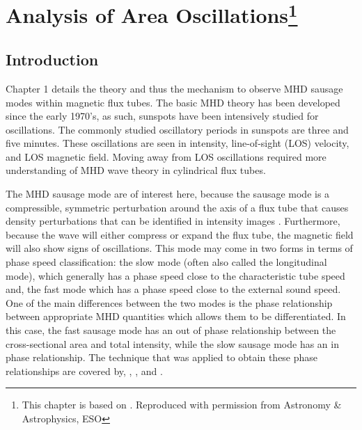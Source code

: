 \graphicspath{{Chapter3/Figs/}}
\nobibliography*

\chapter[Analysis of Area Oscillations]{Analysis of Area Oscillations\footnote{This chapter is based on . Reproduced with permission from Astronomy \& Astrophysics, ESO}}

   \vspace*{\fill}\par
   \pagebreak

\section{Introduction}

	Chapter 1 details the theory and thus the mechanism to observe MHD sausage modes within magnetic flux tubes. 
	The basic MHD theory has been developed since the early 1970's, as such, sunspots have been intensively studied for oscillations. 
	The commonly studied oscillatory periods in sunspots are three and five minutes.
	These oscillations are seen in intensity, line-of-sight (LOS) velocity, and LOS magnetic field.
	Moving away from LOS oscillations required more understanding of MHD wave theory in cylindrical flux tubes. 

	The MHD sausage mode are of interest here, because the sausage mode is a compressible, symmetric perturbation around the axis of a flux tube that causes density perturbations that can be identified in intensity images \citep{PMHDW}.
	Furthermore, because the wave will either compress or expand the flux tube, the magnetic field will also show signs of oscillations.
	This mode may come in two forms in terms of phase speed classification: the slow mode (often also called the longitudinal mode), which generally has a phase speed close to the characteristic tube speed and, the fast mode which has a phase speed close to the external sound speed.
	One of the main differences between the two modes is the phase relationship between appropriate MHD quantities which allows them to be differentiated.
	In this case, the fast sausage mode has an out of phase relationship between the cross-sectional area and total intensity, while the slow sausage mode has an in phase relationship.
	The technique that was applied to obtain these phase relationships are covered by, \cite{PMHDW}, \cite{Moreels2013}, and \cite{Moreels2013b}.


